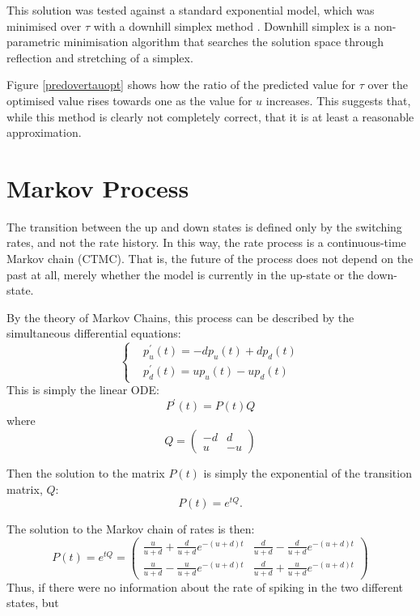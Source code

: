 This solution was tested against a standard exponential model, which was minimised over $\tau$ with a downhill simplex method \citep{NelderMead1965a}.  Downhill simplex is a non-parametric minimisation algorithm that searches the solution space through reflection and stretching of a simplex.

Figure \ref{predovertauopt} shows how the ratio of the predicted value for $\tau$ over the optimised value rises towards one as the value for $u$ increases.  This suggests that, while this method is clearly not completely correct, that it is at least a reasonable approximation.

\section{Markov Process}

The transition between the up and down states is defined only by the switching rates, and not the rate history. In this way, the rate process is a continuous-time Markov chain (CTMC).  That is, the future of the process does not depend on the past at all, merely whether the model is currently in the up-state or the down-state.

By the theory of Markov Chains, this process can be described by the simultaneous differential equations:
\begin{equation}
\left\{
\begin{split} &p_u^{\prime}(t) = -dp_u(t) + dp_d(t)\\ &p_d^{\prime}(t)=up_u(t) - up_d(t)
\end{split}
\right.
\end{equation}
This is simply the linear ODE:
\begin{equation}
P^{\prime}(t) = P(t)Q
\end{equation}
where
\begin{equation}
Q =  \begin{pmatrix} -d & d \\ u & -u \end{pmatrix}
\end{equation}

Then the solution to the matrix $P(t)$ is simply the exponential of the transition matrix, $Q$:
\begin{equation}
P(t) = e^{tQ}.
\end{equation}

The solution to the Markov chain of rates is then:
\begin{equation}
P(t) = e^{tQ} = \begin{pmatrix} \frac{u}{u+d}+\frac{d}{u+d}e^{-(u+d)t} & \frac{d}{u+d} - \frac{d}{u+d}e^{-(u+d)t} \\ \frac{u}{u+d} - \frac{u}{u+d}e^{-(u+d)t} & \frac{d}{u+d} + \frac{u}{u+d}e^{-(u+d)t}\end{pmatrix}
\end{equation}
Thus, if there were no information about the rate of spiking in the two different states, but 

